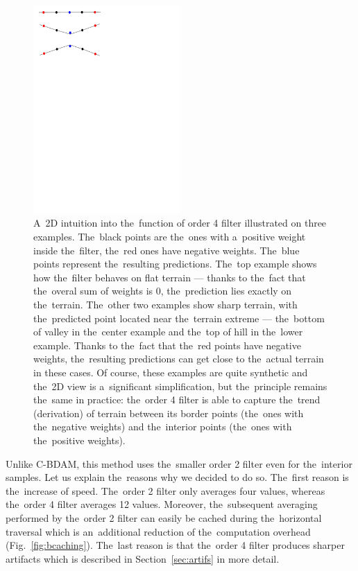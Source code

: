 \begin{figure}
	\includegraphics[trim={0 21cm 10cm 0}, clip, width=0.5\textwidth]{figures/order4_flat.pdf}\centering
	\caption{A~2D intuition into the~function of order 4 filter illustrated on three examples. The~black points are the~ones with a~positive weight inside the~filter, the~red ones have negative weights. The~blue points represent the~resulting predictions. The~top example shows how the~filter behaves on flat terrain --- thanks to the~fact that the~overal sum of weights is 0, the~prediction lies exactly on the~terrain. The~other two examples show sharp terrain, with the~predicted point located near the~terrain extreme --- the~bottom of valley in the~center example and the~top of hill in the~lower example. Thanks to the~fact that the~red points have negative weights, the~resulting predictions can get close to the~actual terrain in these cases. Of course, these examples are quite synthetic and the~2D view is a~significant simplification, but the~principle remains the~same in practice: the~order 4 filter is able to capture the~trend (derivation) of terrain between its border points (the~ones with the~negative weights) and the~interior points (the~ones with the~positive weights).}
	\label{fig:order4_hills}
\end{figure}

Unlike C-BDAM, this method uses the~smaller order 2 filter even for the~interior samples. Let us explain the~reasons why we decided to do so. The~first reason is the~increase of speed. The~order 2 filter only averages four values, whereas the~order 4 filter averages 12 values. Moreover, the~subsequent averaging performed by the~order 2 filter can easily be cached during the~horizontal traversal which is an~additional reduction of the~computation overhead (Fig.~\ref{fig:bcaching}). The~last reason is that the~order 4 filter produces sharper artifacts which is described in Section~\ref{sec:artifs} in more detail.

